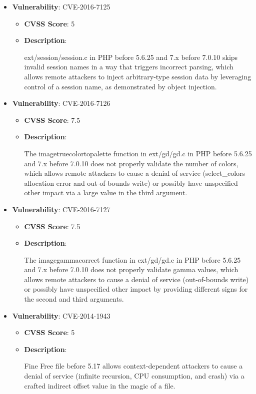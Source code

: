 \documentclass{article}
\begin{document}
\begin{itemize}
        \item \textbf{Vulnerability}: CVE-2016-7125
        \begin{itemize}
            \item \textbf{CVSS Score}:  5 
            \item \textbf{Description}:
            \parbox[t]{0.9\linewidth}{
                \ttfamily ext/session/session.c in PHP before 5.6.25 and 7.x before 7.0.10 skips invalid session names in a way that triggers incorrect parsing, which allows remote attackers to inject arbitrary-type session data by leveraging control of a session name, as demonstrated by object injection.
            }
        \end{itemize}
    
        \item \textbf{Vulnerability}: CVE-2016-7126
        \begin{itemize}
            \item \textbf{CVSS Score}:  7.5 
            \item \textbf{Description}:
            \parbox[t]{0.9\linewidth}{
                \ttfamily The imagetruecolortopalette function in ext/gd/gd.c in PHP before 5.6.25 and 7.x before 7.0.10 does not properly validate the number of colors, which allows remote attackers to cause a denial of service (select\_colors allocation error and out-of-bounds write) or possibly have unspecified other impact via a large value in the third argument.
            }
        \end{itemize}
    
        \item \textbf{Vulnerability}: CVE-2016-7127
        \begin{itemize}
            \item \textbf{CVSS Score}:  7.5 
            \item \textbf{Description}:
            \parbox[t]{0.9\linewidth}{
                \ttfamily The imagegammacorrect function in ext/gd/gd.c in PHP before 5.6.25 and 7.x before 7.0.10 does not properly validate gamma values, which allows remote attackers to cause a denial of service (out-of-bounds write) or possibly have unspecified other impact by providing different signs for the second and third arguments.
            }
        \end{itemize}
    
        \item \textbf{Vulnerability}: CVE-2014-1943
        \begin{itemize}
            \item \textbf{CVSS Score}:  5 
            \item \textbf{Description}:
            \parbox[t]{0.9\linewidth}{
                \ttfamily Fine Free file before 5.17 allows context-dependent attackers to cause a denial of service (infinite recursion, CPU consumption, and crash) via a crafted indirect offset value in the magic of a file.
            }
        \end{itemize}
    

\end{itemize}
\end{document}
